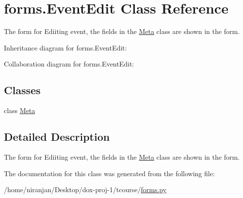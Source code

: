 \hypertarget{classforms_1_1_event_edit}{}\section{forms.\+Event\+Edit Class Reference}
\label{classforms_1_1_event_edit}


The form for Ediiting event, the fields in the \hyperlink{classforms_1_1_event_edit_1_1_meta}{Meta} class are shown in the form.  




Inheritance diagram for forms.\+Event\+Edit\+:


Collaboration diagram for forms.\+Event\+Edit\+:
\subsection*{Classes}
\begin{DoxyCompactItemize}
\item 
class \hyperlink{classforms_1_1_event_edit_1_1_meta}{Meta}
\end{DoxyCompactItemize}


\subsection{Detailed Description}
The form for Ediiting event, the fields in the \hyperlink{classforms_1_1_event_edit_1_1_meta}{Meta} class are shown in the form. 

The documentation for this class was generated from the following file\+:\begin{DoxyCompactItemize}
\item 
/home/niranjan/\+Desktop/dox-\/proj-\/1/tcourse/\hyperlink{forms_8py}{forms.\+py}\end{DoxyCompactItemize}
